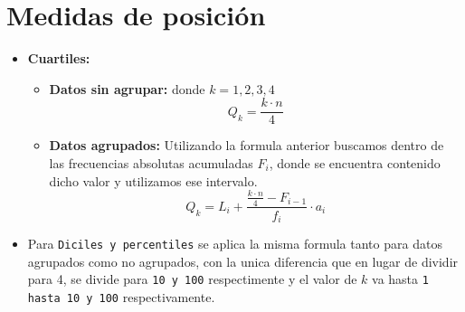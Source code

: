 \documentclass[12pt]{article}
\begin{document}
        \section{Medidas de posición}
            \begin{itemize}
                \item \textbf{Cuartiles:}
                    \begin{itemize}
                        \item \textbf{Datos sin agrupar:} donde $k = 1, 2, 3, 4$
                            \[Q_{k} = \frac{k \cdot n}{4}\]

                        \item \textbf{Datos agrupados:} Utilizando la formula anterior buscamos dentro de las frecuencias absolutas acumuladas $F_{i}$, donde se encuentra contenido dicho valor y utilizamos ese intervalo.
                            \[Q_{k} = L_{i} + \frac{\frac{k \cdot n}{4} - F_{i - 1}}{f_i} \cdot a_{i}\]
                    \end{itemize}

                    \item Para \texttt{Diciles y percentiles} se aplica la misma formula tanto para datos agrupados como no agrupados, con la unica diferencia que en lugar de dividir para 4, se divide para \texttt{10 y 100} respectimente y el valor de $k$ va hasta \texttt{1 hasta 10 y 100} respectivamente.
            \end{itemize}
\end{document}
